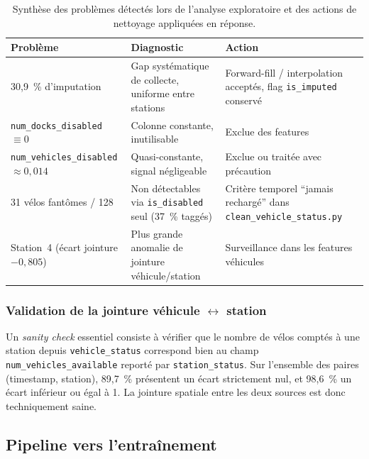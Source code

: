 \documentclass[fleqn, 12pt]{scrartcl}
\begin{document}
\begin{table}[htp]
\centering
\small
\begin{tabular}{p{4.2cm}p{5.5cm}p{4.5cm}}
\hline
\textbf{Problème} & \textbf{Diagnostic} & \textbf{Action} \\
\hline
30{,}9~\% d'imputation & Gap systématique de collecte, uniforme entre stations & Forward-fill / interpolation acceptés, flag \texttt{is\_imputed} conservé \\
\hline
\texttt{num\_docks\_disabled} $\equiv 0$ & Colonne constante, inutilisable & Exclue des features \\
\hline
\texttt{num\_vehicles\_disabled} $\approx 0{,}014$ & Quasi-constante, signal négligeable & Exclue ou traitée avec précaution \\
\hline
31 vélos fantômes / 128 & Non détectables via \texttt{is\_disabled} seul (37~\% taggés) & Critère temporel ``jamais rechargé'' dans \texttt{clean\_vehicle\_status.py} \\
\hline
Station~4 (écart jointure $-0{,}805$) & Plus grande anomalie de jointure véhicule/station & Surveillance dans les features véhicules \\
\hline
\end{tabular}
\caption{Synthèse des problèmes détectés lors de l'analyse exploratoire et des actions de nettoyage appliquées en réponse.}
\label{tab:nettoyage}
\end{table}

\subsubsection*{Validation de la jointure véhicule $\leftrightarrow$ station}

Un \textit{sanity check} essentiel consiste à vérifier que le nombre de vélos comptés à une station depuis \texttt{vehicle\_status} correspond bien au champ \texttt{num\_vehicles\_available} reporté par \texttt{station\_status}. Sur l'ensemble des paires (timestamp, station), 89{,}7~\% présentent un écart strictement nul, et 98{,}6~\% un écart inférieur ou égal à 1. La jointure spatiale entre les deux sources est donc techniquement saine.


\subsection{Pipeline vers l'entraînement}
\label{ssec:pipeline}

\end{document}
